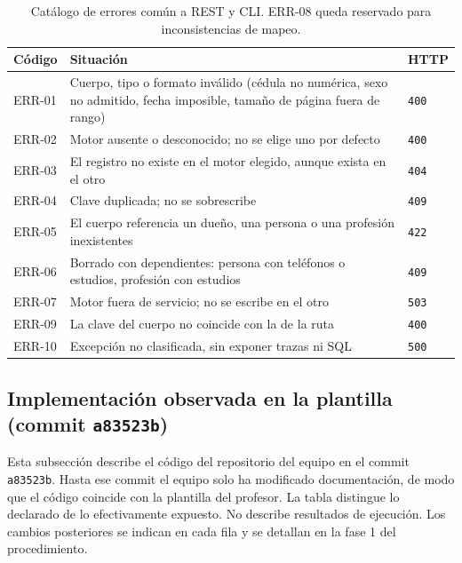 \documentclass[11pt,a4paper]{article}
\begin{document}
\begin{table}[H]
\centering\small
\begin{tabularx}{\textwidth}{@{}p{1.5cm}X p{1.4cm}@{}}
\toprule
\textbf{Código}&\textbf{Situación}&\textbf{HTTP}\\\midrule
ERR-01&Cuerpo, tipo o formato inválido (cédula no numérica, sexo no admitido, fecha imposible, tamaño de página fuera de rango)&\texttt{400}\\
ERR-02&Motor ausente o desconocido; no se elige uno por defecto&\texttt{400}\\
ERR-03&El registro no existe en el motor elegido, aunque exista en el otro&\texttt{404}\\
ERR-04&Clave duplicada; no se sobrescribe&\texttt{409}\\
ERR-05&El cuerpo referencia un dueño, una persona o una profesión inexistentes&\texttt{422}\\
ERR-06&Borrado con dependientes: persona con teléfonos o estudios, profesión con estudios&\texttt{409}\\
ERR-07&Motor fuera de servicio; no se escribe en el otro&\texttt{503}\\
ERR-09&La clave del cuerpo no coincide con la de la ruta&\texttt{400}\\
ERR-10&Excepción no clasificada, sin exponer trazas ni SQL&\texttt{500}\\
\bottomrule
\end{tabularx}
\caption{Catálogo de errores común a REST y CLI. ERR-08 queda reservado para inconsistencias de mapeo.}
\label{tab:errores}
\end{table}

\subsection{Implementación observada en la plantilla (commit \texttt{a83523b})}
Esta subsección describe el código del repositorio del equipo en el commit
\texttt{a83523b}. Hasta ese commit el equipo solo ha modificado documentación, de
modo que el código coincide con la plantilla del profesor. La tabla distingue lo
declarado de lo efectivamente expuesto. No describe resultados de ejecución. Los
cambios posteriores se indican en cada fila y se detallan en la fase 1 del
procedimiento.
\end{document}
